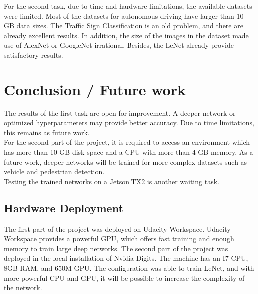 \documentclass[10pt,journal,compsoc]{IEEEtran}
\begin{document}
For the second task, due to time and hardware limitations, the available datasets were limited. Most of the datasets for autonomous driving have larger than 10 GB data sizes. The Traffic Sign Classification is an old problem, and there are already excellent results. In addition, the size of the images in the dataset made use of AlexNet or GoogleNet irrational. Besides, the LeNet already provide satisfactory results.

\section{Conclusion / Future work}
The results of the first task are open for improvement. A deeper network or optimized hyperparameters may provide better accuracy. Due to time limitations, this remains as future work.\\

For the second part of the project, it is required to access an environment which has more than 10 GB disk space and a GPU with more than 4 GB memory. As a future work, deeper networks will be trained for more complex datasets such as vehicle and pedestrian detection.\\

Testing the trained networks on a Jetson TX2 is another waiting task.

\subsection{Hardware Deployment}
The first part of the project was deployed on Udacity Workspace. Udacity Workspace provides a powerful GPU, which offers fast training and enough memory to train large deep networks.
The second part of the project was deployed in the local installation of Nvidia Digits. The machine has an I7 CPU, 8GB RAM, and 650M GPU. The configuration was able to train LeNet, and with more powerful CPU and GPU, it will be possible to increase the complexity of the network. 



\end{document}
